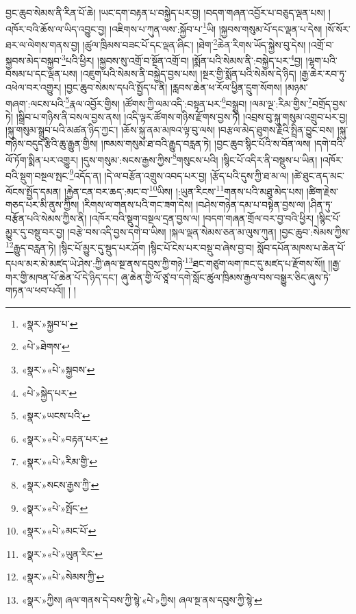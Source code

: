 བྱང་ཆུབ་སེམས་ནི་རིན་པོ་ཆེ། །ཡང་དག་བརྟན་པ་བསྐྱེད་པར་བྱ། །བདག་གཞན་འབྱོར་པ་བཅུད་ལྡན་པས། །འཁོར་བའི་ཆོས་ལ་ཡིད་འབྱུང་བྱ། །འཇིགས་པ་ཀུན་ལས་:སྐྱོབ་པ་\footnote{«སྣར་»སྐྱབ་པ་}ཡི། །སྐྱབས་གསུམ་པོ་དང་ལྡན་པ་དེས། །སོ་སོར་ཐར་ལ་ལེགས་གནས་བྱ། །ཚུལ་ཁྲིམས་བཟང་པོ་དང་ལྡན་ཞིང་། །ཐེག་\footnote{«པེ་»ཐེགས་}ཆེན་རིགས་ཡོད་སྐྱེས་བུ་དེས། །འགྲོ་བ་སྐྱབས་མེད་བསྐྱབ་\footnote{«སྣར་»«པེ་»སྐྱབས་}པའི་ཕྱིར། །སྐྱབས་སུ་འགྲོ་བ་སྔོན་འགྲོ་བ། །སྨོན་པའི་སེམས་ནི་:བསྐྱེད་པར་\footnote{«པེ་»སྐྱེད་པར་}བྱ། །ལྷག་པའི་བསམ་པ་དང་ལྡན་པས། །འཇུག་པའི་སེམས་ནི་བསྐྱེད་བྱས་པས། །སྔར་གྱི་སྨོན་པའི་སེམས་དེ་ཉིད། །རྒྱ་ཆེར་རབ་ཏུ་འཕེལ་བར་འགྱུར། །བྱང་ཆུབ་སེམས་དཔའི་སྤྱོད་པ་ནི། །རླབས་ཆེན་ཕ་རོལ་ཕྱིན་དྲུག་སོགས། །མཉམ་གཞག་:ལངས་པའི་\footnote{«སྣར་»ཡངས་པའི་}རྣལ་འབྱོར་གྱིས། །ཚོགས་ཀྱི་ལམ་འདི་:བསྟན་པར་\footnote{«སྣར་»«པེ་»བརྟན་པར་}བསྒྲུབ། །ལམ་ལྔ་:རིམ་གྱིས་\footnote{«སྣར་»«པེ་»རིམ་གྱི་}བགྲོད་བྱས་ཏེ། །སྒྲིབ་པ་གཉིས་ནི་བསལ་བྱས་ནས། །འདི་ལྟར་ཚོགས་གཉིས་རྫོགས་བྱས་ཏེ། །འབྲས་བུ་སྐུ་གསུམ་འགྲུབ་པར་བྱ། །སྐུ་གསུམ་སྒྲུབ་པའི་མཚན་ཉིད་ཀྱང་། །ཆོས་སྐུ་ནམ་མཁའ་ལྟ་བུ་ལས། །བརྩལ་མེད་ཐུགས་རྗེའི་སྤྲིན་བྱུང་བས། །སྐུ་གཉིས་བདུད་རྩིའི་ཆུ་རྒྱུན་གྱིས། །ཁམས་གསུམ་ཐ་བའི་རྒྱུད་བརླན་ཏེ། །བྱང་ཆུབ་སྙིང་པོའི་ས་བོན་ལས། །དགེ་བའི་ལོ་ཏོག་སྨིན་པར་འགྱུར། །དུས་གསུམ་:སངས་རྒྱས་ཀྱིས་\footnote{«སྣར་»སངས་རྒྱས་ཀྱི་}གསུངས་པའི། །སྙིང་པོ་འདིར་ནི་བསྡུས་པ་ཡིན། །འཁོར་བའི་སྡུག་བསྔལ་སྤང་\footnote{«སྣར་»«པེ་»སྤོང་}འདོད་ན། །དེ་ལ་བརྩོན་འགྲུས་འབད་པར་བྱ། །རྩོད་པའི་དུས་ཀྱི་ཐ་མ་ལ། །ཚེ་ཐུང་ནད་མང་ལོངས་སྤྱོད་དམན། །རྐྱེན་ངན་བར་ཆད་:མང་བ་\footnote{«སྣར་»«པེ་»མང་པོ་}ཡིས། །:ཡུན་རིངས་\footnote{«སྣར་»«པེ་»ཡུན་རིང་}གནས་པའི་མཐུ་མེད་པས། །ཚིག་རྗེས་གཅད་པར་མི་ནུས་ཀྱིས། །རིགས་ལ་གནས་པའི་གང་ཟག་དེས། །བཤེས་གཉེན་དམ་པ་བསྟེན་བྱས་ལ། །ཤིན་ཏུ་བརྩོན་པའི་སེམས་ཀྱིས་ནི། །འཁོར་བའི་སྡུག་བསྔལ་དྲན་བྱས་ལ། །བདག་གཞན་གྲོལ་བར་བྱ་བའི་ཕྱིར། །སྙིང་པོ་མྱུར་དུ་བསྡུ་བར་བྱ། །བརྩེ་བས་འདི་བྱས་དགེ་བ་ཡིས། །སྐལ་ལྡན་སེམས་ཅན་མ་ལུས་ཀུན། །བྱང་ཆུབ་:སེམས་ཀྱིས་\footnote{«སྣར་»«པེ་»སེམས་ཀྱི་}རྒྱུད་བརླན་ཏེ། །སྙིང་པོ་མྱུར་དུ་སྡུད་པར་ཤོག །སྙིང་པོ་ངེས་པར་བསྡུ་བ་ཞེས་བྱ་བ། སློབ་དཔོན་མཁས་པ་ཆེན་པོ་དཔལ་མར་མེ་མཛད་ཡེ་ཤེས་:ཀྱི་ཞལ་སྔ་ནས་དབུས་ཀྱི་གཉེ་\footnote{«སྣར་»ཀྱིས། ཞལ་གནས་དེ་བས་ཀྱི་སྙེ་«པེ་»ཀྱིས། ཞལ་སྔ་ནས་དབུས་ཀྱི་སྙེ་}ཐང་གཙུག་ལག་ཁང་དུ་མཛད་པ་རྫོགས་སོ།། །།རྒྱ་གར་གྱི་མཁན་པོ་ཆེན་པོ་དེ་ཉིད་དང་། ཞུ་ཆེན་གྱི་ལོ་ཙཱ་བ་དགེ་སློང་ཚུལ་ཁྲིམས་རྒྱལ་བས་བསྒྱུར་ཅིང་ཞུས་ཏེ་གཏན་ལ་ཕབ་པའོ།། །
།